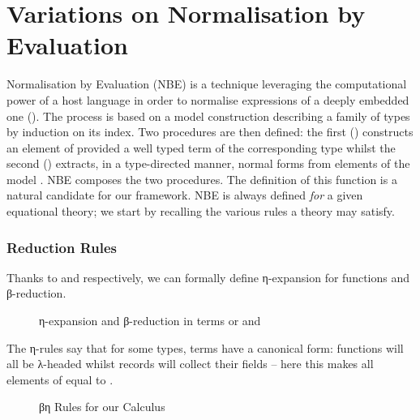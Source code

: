 \chapter{Variations on Normalisation by Evaluation}
\label{sec:variationsnormalisation}

Normalisation by Evaluation (NBE) is a technique leveraging the computational
power of a host language in order to normalise expressions of a deeply
embedded one (\cite{berger1991inverse,berger1993program,CoqDybSK,coquand2002formalised}).
The process is based on a model construction describing a family of
types by induction on its  index. Two
procedures are then defined: the first () constructs an element
of    provided a well typed term of the corresponding
   type whilst the second () extracts, in
a type-directed manner, normal forms    from elements
of the model   . NBE composes the two procedures. The
definition of this  function is a natural candidate for our
 framework. NBE is always defined \emph{for} a
given equational theory; we start by recalling the various
rules a theory may satisfy.

\subsection{Reduction Rules}

Thanks to  and  respectively, we can formally
define η-expansion for functions and β-reduction.

\begin{figure}[h]
\caption{η-expansion and β-reduction in terms or  and }
\end{figure}

The η-rules say that for some types, terms have a canonical form: functions will all
be λ-headed whilst records will collect their fields -- here this makes all elements
of \AIC{\unit{}} equal to .

\begin{figure}[h]
\caption{βη Rules for our Calculus\label{fig:betaetarules}}
\end{figure}

